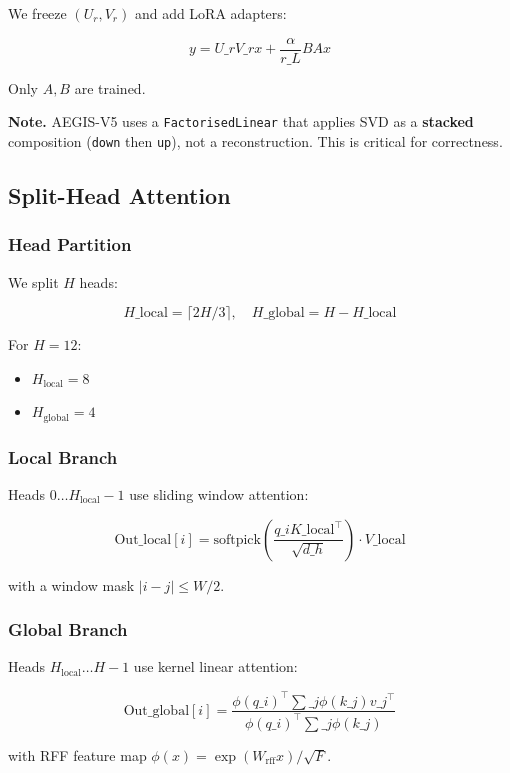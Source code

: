 We freeze $(U_r, V_r)$ and add LoRA adapters:

\[
y = U\_r V\_r x + \frac{\alpha}{r\_L} B A x
\]

Only $A, B$ are trained.

\textbf{Note.} AEGIS-V5 uses a \texttt{FactorisedLinear} that applies SVD as a \textbf{stacked} 
composition (\texttt{down} then \texttt{up}), not a reconstruction. This is critical for 
correctness.

\subsection{Split-Head Attention}

\subsubsection{Head Partition}

We split $H$ heads:

\[
H\_\text{local} = \lceil 2H/3 \rceil, \quad
H\_\text{global} = H - H\_\text{local}
\]

For $H = 12$:
\begin{itemize}
\item $H_\text{local} = 8$
\item $H_\text{global} = 4$

\end{itemize}
\subsubsection{Local Branch}

Heads $0 \ldots H_\text{local} - 1$ use sliding window attention:

\[
\text{Out}\_\text{local}[i] = \text{softpick}\!\left(\frac{q\_i K\_\text{local}^\top}{\sqrt{d\_h}}\right) \cdot V\_\text{local}
\]

with a window mask $|i - j| \leq W/2$.

\subsubsection{Global Branch}

Heads $H_\text{local} \ldots H - 1$ use kernel linear attention:

\[
\text{Out}\_\text{global}[i] = \frac{\phi(q\_i)^\top \sum\_j \phi(k\_j) v\_j^\top}{\phi(q\_i)^\top \sum\_j \phi(k\_j)}
\]

with RFF feature map $\phi(x) = \exp(W_\text{rff} x) / \sqrt{F}$.

